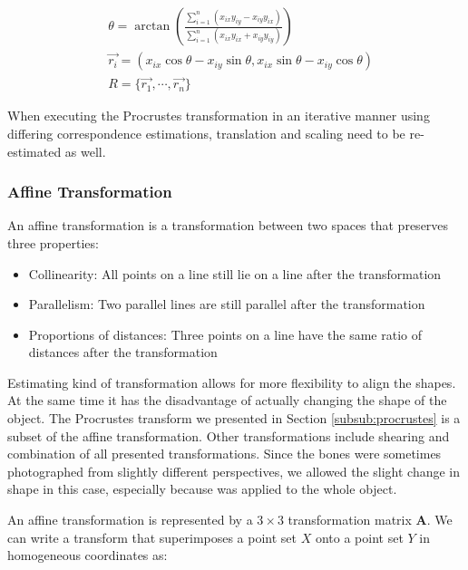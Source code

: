 \documentclass[pdftex,12pt,a4paper]{report}
\begin{document}
\begin{equation}
\begin{split}
& \theta = \arctan{\left( \frac{\sum\limits_{i = 1}^n(x_{ix}y_{iy} - x_{iy} y_{ix})}{\sum\limits_{i = 1}^n (x_{ix} y_{ix} + x_{iy} y_{iy}) } \right)} \\
& \vec{r_i} = { (x_{ix} \cos\theta - x_{iy} \sin\theta, x_{ix} \sin\theta - x_{iy} \cos\theta) } \\
& R = \{ \vec{r_1}, \cdots, \vec{r_n} \}
\end{split}
\end{equation}

When executing the Procrustes transformation in an iterative manner using differing correspondence estimations,
translation and scaling need to be re-estimated as well.

\subsubsection{Affine Transformation}
\label{subsub:affine}

An affine transformation is a transformation between two spaces that preserves three properties:

\begin{itemize}
\item Collinearity: All points on a line still lie on a line after the transformation
\item Parallelism: Two parallel lines are still parallel after the transformation
\item Proportions of distances: Three points on a line have the same ratio of distances after the transformation
\end{itemize}

Estimating kind of transformation allows for more flexibility to align the shapes. At the same time it has the
disadvantage of actually changing the shape of the object. The Procrustes transform we presented in Section
\ref{subsub:procrustes} is a subset of the affine transformation. Other transformations include shearing and combination of all presented transformations. Since the bones were sometimes photographed from
slightly different perspectives, we allowed the slight change in shape in this case, especially because was
applied to the whole object.

An affine transformation is represented by a $3\times3$ transformation matrix $\mathbf{A}$. We can write a transform that
superimposes a point set $X$ onto a point set $Y$ in homogeneous coordinates as:
\end{document}
